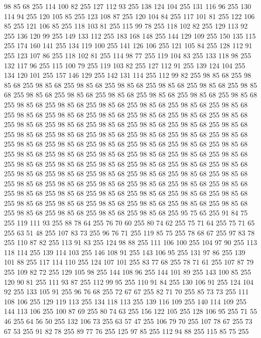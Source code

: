 98 85 68 255 114 100 82 255 127 112 93 255 138 124 104 255 131 116 96 255 130 114 94 255 120 105 85 255 123 108 87 255 120 104 84 255 117 101 81 255 122 106 85 255 121 106 85 255 118 103 81 255 115 99 78 255 118 102 82 255 129 113 92 255 136 120 99 255 149 133 112 255 183 168 148 255 144 129 109 255 150 135 115 255 174 160 141 255 134 119 100 255 141 126 106 255 121 105 84 255 128 112 91 255 123 107 86 255 118 102 81 255 114 98 77 255 119 104 83 255 133 118 98 255 132 117 96 255 115 100 79 255 119 103 82 255 127 112 91 255 139 124 104 255 134 120 101 255 157 146 129 255 142 131 114 255 112 99 82 255 98 85 68 255 98 85 68 255 98 85 68 255 98 85 68 255 98 85 68 255 98 85 68 255 98 85 68 255 98 85 68 255 98 85 68 255 98 85 68 255 98 85 68 255 98 85 68 255 98 85 68 255 98 85 68 255 98 85 68 255 98 85 68 255 98 85 68 255 98 85 68 255 98 85 68 255 98 85 68 255 98 85 68 255 98 85 68 255 98 85 68 255 98 85 68 255
98 85 68 255 98 85 68 255 98 85 68 255 98 85 68 255 98 85 68 255 98 85 68 255 98 85 68 255 98 85 68 255 98 85 68 255 98 85 68 255 98 85 68 255 98 85 68 255 98 85 68 255 98 85 68 255 98 85 68 255 98 85 68 255 98 85 68 255 98 85 68 255 98 85 68 255 98 85 68 255 98 85 68 255 98 85 68 255 98 85 68 255 98 85 68 255 98 85 68 255 98 85 68 255 98 85 68 255 98 85 68 255 98 85 68 255 98 85 68 255 98 85 68 255 98 85 68 255 98 85 68 255 98 85 68 255 98 85 68 255 98 85 68 255 98 85 68 255 98 85 68 255 98 85 68 255 98 85 68 255 98 85 68 255 98 85 68 255 98 85 68 255 98 85 68 255 98 85 68 255 98 85 68 255 98 85 68 255 98 85 68 255 98 85 68 255 98 85 68 255 98 85 68 255 98 85 68 255 98 85 68 255 98 85 68 255 98 85 68 255 98 85 68 255 98 85 68 255 98 85 68 255 98 85 68 255 98 85 68 255 95 75 65 255 91 84 75 255 119 111 93 255 88 78 64 255
76 70 60 255 80 74 62 255 75 71 64 255 75 71 65 255 63 51 48 255 107 83 73 255 96 76 71 255 119 85 75 255 78 68 67 255 97 83 78 255 110 87 82 255 113 91 83 255 124 98 88 255 111 106 100 255 104 97 90 255 113 118 114 255 139 114 103 255 146 108 91 255 143 106 95 255 131 97 86 255 139 101 88 255 117 114 110 255 124 107 101 255 83 77 68 255 78 71 61 255 107 87 79 255 109 82 72 255 129 105 98 255 144 108 96 255 144 101 89 255 143 100 85 255 120 90 81 255 111 93 87 255 112 99 95 255 110 91 84 255 130 106 91 255 124 104 92 255 133 105 91 255 96 76 68 255 72 67 67 255 82 71 70 255 85 73 73 255 111 108 106 255 129 119 113 255 134 118 113 255 139 116 109 255 140 114 109 255 144 113 106 255 100 87 69 255 80 74 63 255 156 122 105 255 128 106 95 255 71 55 46 255 64 56 50 255 132 106 73 255 63 57 47 255 106 79 70 255 107 78 67 255 73 67 53 255 91 82 78 255 89 77 76 255 125 97 85 255 112 94 88 255 115 85 75 255

